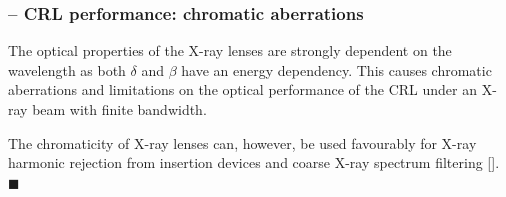 \begin{refsection}
\subsubsection*{-- CRL performance: chromatic aberrations}

The optical properties of the X-ray lenses are strongly dependent on the wavelength as both $\delta$ and $\beta$ have an energy dependency. This causes chromatic aberrations and limitations on the optical performance of the CRL under an X-ray beam with finite bandwidth. 

The chromaticity of X-ray lenses can, however, be used favourably for X-ray harmonic rejection from insertion devices and coarse X-ray spectrum filtering [\cite{Vaughan2011, Polikarpov2014}]. $\blacksquare$
\printbibliography[heading=subbibliography]
\end{refsection}



